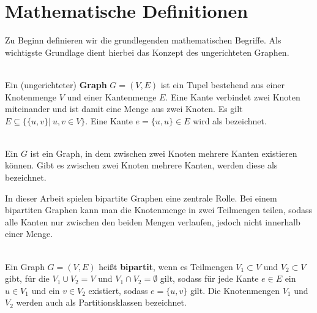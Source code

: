 



\section{Mathematische Definitionen}
Zu Beginn definieren wir die grundlegenden mathematischen Begriffe. Als wichtigste Grundlage dient 
hierbei das Konzept des ungerichteten Graphen.
\begin{definition}[Graph] ~\\
Ein (ungerichteter) \textbf{Graph} $G = (V,E)$ ist ein Tupel bestehend aus einer Knotenmenge $V$ und einer Kantenmenge
 $E$. Eine Kante verbindet zwei Knoten miteinander und ist damit eine Menge aus zwei Knoten.
 Es gilt $E \subseteq \{ \{u,v\} |\ u,v \in V\}$. Eine Kante $e = \{u,u\} \in E$ wird als 
 bezeichnet.
\end{definition}
\begin{definition}[Multigraph] ~\\
Ein  $G$ ist ein Graph, in dem zwischen zwei Knoten mehrere Kanten existieren 
können. Gibt es zwischen zwei Knoten mehrere Kanten, werden diese als  bezeichnet.
\end{definition}

In dieser Arbeit spielen bipartite Graphen eine zentrale Rolle.
Bei einem bipartiten Graphen kann man die Knotenmenge in zwei Teilmengen teilen, sodass alle Kanten nur zwischen den 
beiden Mengen verlaufen, jedoch nicht innerhalb einer Menge.
\begin{definition} ~\\
Ein Graph $G=(V,E)$ heißt \textbf{bipartit}, wenn es Teilmengen $V_1 \subset V$ und $V_2 \subset V$ gibt, für die 
$V_1 \cup V_2 = V$ und $V_1 \cap V_2 = \emptyset$ gilt,
 sodass für jede Kante $e \in E$ ein $u \in V_1$ und ein $v \in V_2$ existiert, sodass $e = \{u,v\}$ gilt.
Die Knotenmengen $V_1$ und $V_2$ werden auch als Partitionsklassen bezeichnet.
\end{definition}

